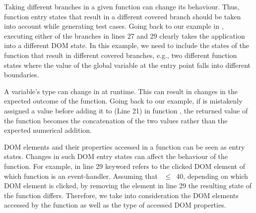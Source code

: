 \begin{description}[noitemsep, leftmargin=0.4cm]
\item[Branch coverage:] Taking different branches in a given function can change its behaviour. Thus, function entry states that result in a different covered branch should be taken into account while generating test cases. Going back to our example in , executing either of the branches in lines 27 and 29 clearly takes the application into a different DOM state. In this example, we need to include the  states of the  function that result in different covered branches, e.g., two different function states where the value of the 
global variable  at the entry point falls into different boundaries.   

\item[Return value type:] A variable's type can change in \javascript at runtime. This can result in changes in the expected outcome of the function. Going back to our example, if  is mistakenly assigned a  value before adding it to  (Line 21) in function , the returned value of the function becomes the  concatenation of the two values rather than the expected numerical addition. 

\item[Accessed DOM properties:] DOM elements and their properties accessed in a function can be seen as entry states. Changes in such DOM entry states can affect the behaviour of the function. For example, in line 29  keyword refers to the clicked DOM element of which function  is an event-handler. Assuming that ~$\leq$~40, depending on which DOM element is clicked, by removing the element in line 29 the resulting state of the function  differs.
Therefore, we take into consideration the DOM elements accessed by the function as well as the type of accessed DOM properties.

\end{description}

